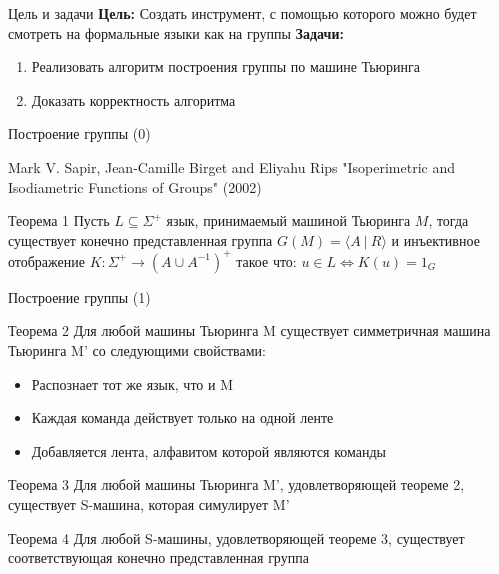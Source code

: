 \documentclass[xcolor=table]{beamer}
\begin{document}
\begin{frame}[fragile]{Цель и задачи}
\textbf{Цель:} Создать инструмент, с помощью которого можно будет смотреть на формальные языки как на группы
\newline
\newline
\textbf{Задачи:}
    \begin{enumerate}
        \item Реализовать алгоритм построения группы по машине Тьюринга
        \item Доказать корректность алгоритма
    \end{enumerate}
\end{frame}

\begin{frame}[fragile]{Построение группы (0)}
\begin{center}
    Mark V. Sapir, Jean-Camille Birget and Eliyahu Rips "Isoperimetric and Isodiametric Functions of Groups" (2002)
    \end{center}
    \begin{block}{Теорема 1}
		Пусть $L \subseteq \Sigma^+$ язык, принимаемый машиной Тьюринга $M$,
    тогда существует конечно представленная группа $G(M)=\langle A~|~R \rangle$
    и инъективное отображение $K: \Sigma^+ \to (A \cup A^{-1})^+$ такое что:
    $u \in L \iff K(u)=1_G$
	\end{block}
\end{frame}

\begin{frame}[fragile]{Построение группы (1)}
\begin{block}{Теорема 2}
Для любой машины Тьюринга M существует симметричная машина Тьюринга M' со следующими свойствами:
    \begin{itemize}
        \item Распознает тот же язык, что и M
        \item Каждая команда действует только на одной ленте
        \item Добавляется лента, алфавитом которой являются команды
    \end{itemize}
\end{block}
\pause
\begin{block}{Теорема 3}
Для любой машины Тьюринга M', удовлетворяющей теореме 2, существует S-машина, которая симулирует M'
\end{block}
\pause
\begin{block}{Теорема 4}
Для любой S-машины, удовлетворяющей теореме 3, существует соответствующая конечно представленная группа
\end{block}
\end{frame}
\end{document}
